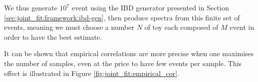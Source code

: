 \documentclass[../main.tex]{subfiles}
\begin{document}
We thus generate $10^7$ event using the IBD generator presented in Section \ref{sec:joint_fit:framework:ibd-gen}, then produce spectra from this finite set of events, meaning we must choose a number $N$ of toy each composed of $M$ event in order to have the best estimate.

It can be shown that empirical correlations are more precise when one maximises the number of samples, even at the price to have few events per sample. This effect is illustrated in Figure \ref{fig:joint_fit:empirical_cor}.

%
\end{document}
